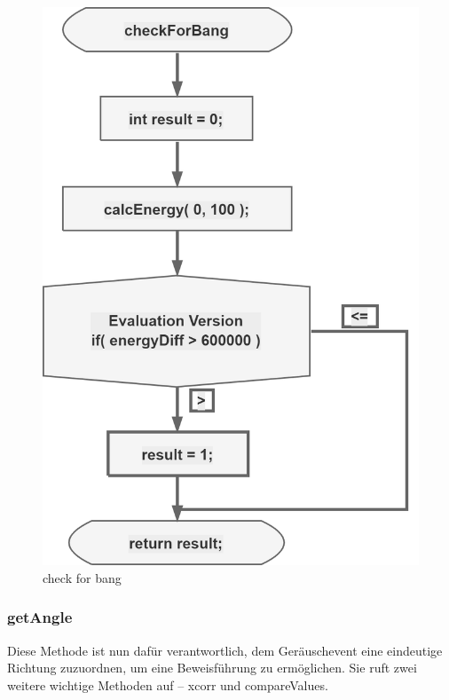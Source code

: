 \begin{figure}[h]
	\begin{center}
		\includegraphics[scale=0.1]{Sections/Programmierung/checkForBang}
	\end{center}
	\caption{check for bang}
	\label{fig:checkForBang}
\end{figure}

\subsubsection{getAngle}

Diese Methode ist nun dafür verantwortlich, dem Geräuschevent eine eindeutige Richtung zuzuordnen, um eine Beweisführung zu ermöglichen. Sie ruft zwei weitere wichtige Methoden auf – xcorr und compareValues.

